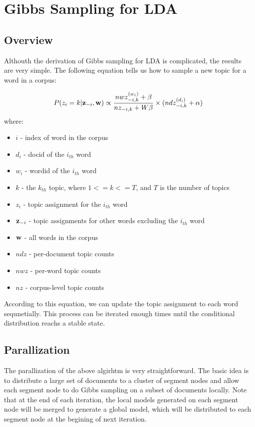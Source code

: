 \section{Gibbs Sampling for LDA}
\subsection{Overview}
Althouth the derivation of Gibbs sampling for LDA is complicated, the results are very simple. The following equation tells us how to sample a new topic for a word in a corpus:

\begin{equation}
P(z_i=k|{\bf z}_{-i},{\bf w}) \propto \frac{nwz_{-i,k}^{(w_i)} +\beta}{nz_{-i,k}+W \beta}\times(ndz_{-i,k}^{(d_i)}+\alpha)
\end{equation}
where:
\begin{itemize}
\item $i$ - index of word in the corpus
\item $d_i$ - docid of the $i_{th}$ word
\item $w_i$ - wordid of the $i_{th}$ word
\item $k$ - the $k_{th}$ topic, where $1 <= k <= T$, and $T$ is the number of topics
\item $z_i$ - topic assignment for the $i_{th}$ word
\item ${\bf z}_{-i}$ - topic assignments for other words excluding the $i_{th}$ word
\item ${\bf w}$ - all words in the corpus
\item $ndz$ - per-document topic counts
\item $nwz$ - per-word topic counts
\item $nz$ - corpus-level topic counts
\end{itemize}

According to this equation, we can update the topic assignment to each word sequnetially. This process can be iterated enough times until the conditional distribution reachs a stable state.

\subsection{Parallization}
The parallization of the above algirhtm is very straightforward. The basic idea is to distribute a large set of documents to a cluster of segment nodes and allow each segment node to do Gibbs sampling on a subset of documents locally. Note that at the end of each iteration, the local models generated on each segment node will be merged to generate a global model, which will be distributed to each segment node at the begining of next iteration.

